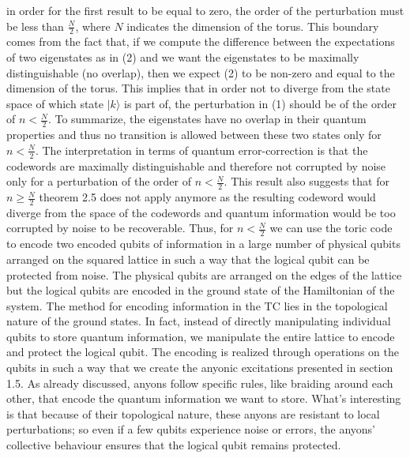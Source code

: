 \documentclass{Configuration_Files/PoliMi3i_thesis}
\begin{document}
in order for the first result to be equal to zero, the order of the perturbation must be less than $ \frac{N}{2}$, where $N$ indicates the dimension of the torus. 
This boundary comes from the fact that, if we compute the difference between the expectations of two eigenstates as in (2) and we want the eigenstates to be maximally distinguishable (no overlap), then we expect (2) to be non-zero and equal to the dimension of the torus. 
This implies that in order not to diverge from the state space of which state $| k \rangle$  is part of, the perturbation in (1) should be of the order of $n < \frac{N}{2}$. To summarize, the eigenstates have no overlap in their quantum properties and thus no transition is allowed between these two states only for $n < \frac{N}{2}$. The interpretation in terms of quantum error-correction is that the codewords are maximally distinguishable and therefore not corrupted by noise only for a perturbation of the order of $n < \frac{N}{2}$. \newline
This result also suggests that for $n \geq \frac{N}{2}$ theorem 2.5 does not apply anymore as the resulting codeword would diverge from the space of the codewords and quantum information would be too corrupted by noise to be recoverable.
\newline
Thus, for $n < \frac{N}{2}$ we can use the toric code to encode two encoded qubits of information in a large number of physical qubits arranged on the squared lattice in such a way that the logical qubit can be protected from noise. The physical qubits are arranged on the edges of the lattice but the logical qubits are encoded in the ground state of the Hamiltonian of the system. 
The method for encoding information in the TC lies in the topological nature of the ground states. In fact, instead of directly manipulating individual qubits to store quantum information, we manipulate the entire lattice to encode and protect the logical qubit. The encoding is realized through operations on the qubits in such a way that we create the anyonic excitations presented in section 1.5. As already discussed, anyons follow specific rules, like braiding around each other, that encode the quantum information we want to store. What's interesting is that because of their topological nature, these anyons are resistant to local perturbations; so even if a few qubits experience noise or errors, the anyons' collective behaviour ensures that the logical qubit remains protected. \newline
\end{document}

